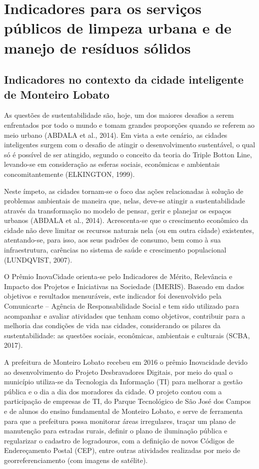 	\section{Indicadores para os serviços públicos de limpeza urbana e de manejo de resíduos sólidos}
	
	\subsection{Indicadores no contexto da cidade inteligente de Monteiro Lobato}
	As questões de sustentabilidade são, hoje, um dos maiores desafios a serem enfrentados por todo o mundo e tomam grandes proporções quando se referem ao meio urbano (ABDALA et al., 2014). Em vista a este cenário, as cidades inteligentes surgem com o desafio de atingir o desenvolvimento sustentável, o qual só é possível de ser atingido, segundo o conceito da teoria do Triple Botton Line, levando-se em consideração as esferas sociais, econômicas e ambientais concomitantemente (ELKINGTON, 1999).
	
	Neste ímpeto, as cidades tornam-se o foco das ações relacionadas à solução de problemas ambientais de maneira que, nelas, deve-se atingir a sustentabilidade através da transformação no modelo de pensar, gerir e planejar os espaços urbanos (ABDALA et al., 2014). Acrescenta-se que o crescimento econômico da cidade não deve limitar os recursos naturais nela (ou em outra cidade) existentes, atentando-se, para isso, aos seus padrões de consumo, bem como à sua infraestrutura, carências no sistema de saúde e crescimento populacional (LUNDQVIST, 2007).
	
	O Prêmio InovaCidade orienta-se pelo Indicadores de Mérito, Relevância e Impacto dos Projetos e Iniciativas na Sociedade (IMERIS). Baseado em dados objetivos e resultados mensuráveis, este indicador foi desenvolvido pela Comunicarte – Agência de Responsabilidade Social e tem sido utilizado para acompanhar e avaliar atividades que tenham como objetivos, contribuir para a melhoria das condições de vida nas cidades, considerando os pilares da sustentabilidade: as questões sociais, econômicas, ambientais e culturais (SCBA, 2017).
	
	A prefeitura de Monteiro Lobato recebeu em 2016 o prêmio Inovacidade devido ao desenvolvimento do Projeto Desbravadores Digitais, por meio do qual o município utiliza-se da Tecnologia da Informação (TI) para melhorar a gestão pública e o dia a dia dos moradores da cidade. O projeto contou com a participação de empresas de TI, do Parque Tecnológico de São José dos Campos e de alunos do ensino fundamental de Monteiro Lobato, e serve de ferramenta para que a prefeitura possa monitorar áreas irregulares, traçar um plano de manutenção para estradas rurais, definir o plano de iluminação pública e regularizar o cadastro de logradouros, com a definição de novos Códigos de Endereçamento Postal (CEP), entre outras atividades realizadas por meio de georreferenciamento (com imagens de satélite).
	

